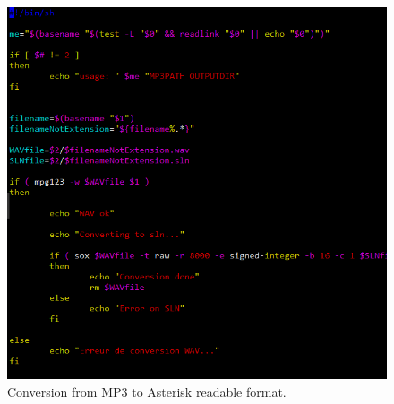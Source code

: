 \begin{figure}[!ht]
  \caption{Conversion from MP3 to Asterisk readable format.}
  \centering
    \includegraphics[width=1\textwidth]{img/convertMP3.png}
\end{figure}

